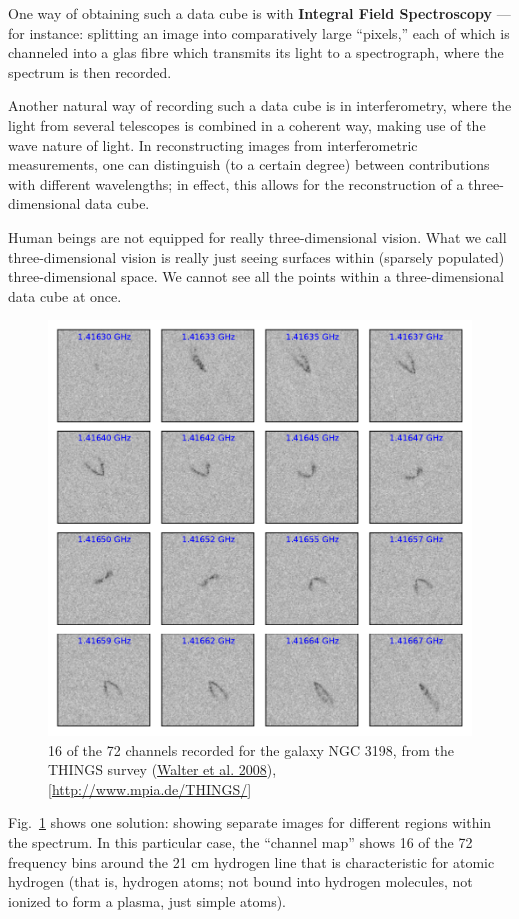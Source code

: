\documentclass[twocolumn,apj]{openjournal}
\begin{document}
One way of obtaining such a data cube is with {\bf Integral Field Spectroscopy} ---  for instance: splitting an image into comparatively large ``pixels,'' each of which is channeled into a glas fibre which transmits its light to a spectrograph, where the spectrum is then recorded. 

Another natural way of recording such a data cube is in interferometry, where the light from several telescopes is combined in a coherent way, making use of the wave nature of light. In reconstructing images from interferometric measurements, one can distinguish (to a certain degree) between contributions with different wavelengths; in effect, this allows for the reconstruction of a three-dimensional data cube.

Human beings are not equipped for really three-dimensional vision. What we call three-dimensional vision is really just seeing surfaces within (sparsely populated) three-dimensional space. We cannot see all the points within a three-dimensional data cube at once. 
\begin{figure}[htbp]
\begin{center}
\includegraphics[width=\linewidth]{channel-map-things.pdf}
\caption{16 of the 72 channels recorded for the galaxy NGC 3198, from the THINGS survey (\href{https://ui.adsabs.harvard.edu/abs/2008AJ....136.2563W/abstract}{Walter et al. 2008}),
[\href{http://www.mpia.de/THINGS/}{http://www.mpia.de/THINGS/}] }
\label{THINGSchannelmap}
\end{center}
\end{figure}
Fig.~\ref{THINGSchannelmap} shows one solution: showing separate images for different regions within the spectrum. In this particular case, the ``channel map'' shows 16 of the 72 frequency bins around the 21 cm hydrogen line that is characteristic for atomic hydrogen (that is, hydrogen atoms; not bound into hydrogen molecules, not ionized to form a plasma, just simple atoms). 
\end{document}
